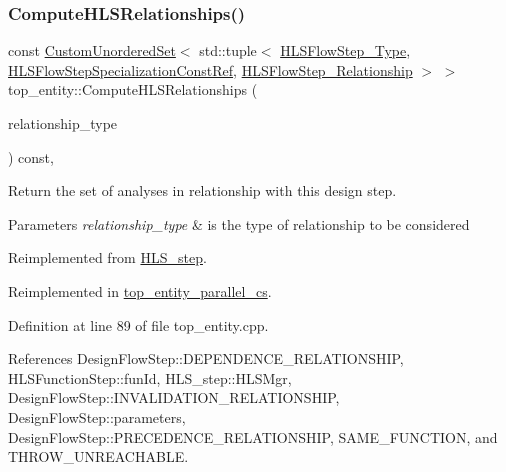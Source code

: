 \subsubsection{\texorpdfstring{Compute\+H\+L\+S\+Relationships()}{ComputeHLSRelationships()}}
{\footnotesize\ttfamily const \hyperlink{classCustomUnorderedSet}{Custom\+Unordered\+Set}$<$ std\+::tuple$<$ \hyperlink{hls__step_8hpp_ada16bc22905016180e26fc7e39537f8d}{H\+L\+S\+Flow\+Step\+\_\+\+Type}, \hyperlink{hls__step_8hpp_a5fdd2edf290c196531d21d68e13f0e74}{H\+L\+S\+Flow\+Step\+Specialization\+Const\+Ref}, \hyperlink{hls__step_8hpp_a3ad360b9b11e6bf0683d5562a0ceb169}{H\+L\+S\+Flow\+Step\+\_\+\+Relationship} $>$ $>$ top\+\_\+entity\+::\+Compute\+H\+L\+S\+Relationships (\begin{DoxyParamCaption}\item[{const \hyperlink{classDesignFlowStep_a723a3baf19ff2ceb77bc13e099d0b1b7}{Design\+Flow\+Step\+::\+Relationship\+Type}}]{relationship\+\_\+type }\end{DoxyParamCaption}) const\hspace{0.3cm}{\ttfamily [protected]}, {\ttfamily [virtual]}}



Return the set of analyses in relationship with this design step. 


\begin{DoxyParams}{Parameters}
{\em relationship\+\_\+type} & is the type of relationship to be considered \\
\hline
\end{DoxyParams}


Reimplemented from \hyperlink{classHLS__step_aed0ce8cca9a1ef18e705fc1032ad4de5}{H\+L\+S\+\_\+step}.



Reimplemented in \hyperlink{classtop__entity__parallel__cs_a619b309604994e682d4f2c4f0989efde}{top\+\_\+entity\+\_\+parallel\+\_\+cs}.



Definition at line 89 of file top\+\_\+entity.\+cpp.



References Design\+Flow\+Step\+::\+D\+E\+P\+E\+N\+D\+E\+N\+C\+E\+\_\+\+R\+E\+L\+A\+T\+I\+O\+N\+S\+H\+IP, H\+L\+S\+Function\+Step\+::fun\+Id, H\+L\+S\+\_\+step\+::\+H\+L\+S\+Mgr, Design\+Flow\+Step\+::\+I\+N\+V\+A\+L\+I\+D\+A\+T\+I\+O\+N\+\_\+\+R\+E\+L\+A\+T\+I\+O\+N\+S\+H\+IP, Design\+Flow\+Step\+::parameters, Design\+Flow\+Step\+::\+P\+R\+E\+C\+E\+D\+E\+N\+C\+E\+\_\+\+R\+E\+L\+A\+T\+I\+O\+N\+S\+H\+IP, S\+A\+M\+E\+\_\+\+F\+U\+N\+C\+T\+I\+ON, and T\+H\+R\+O\+W\+\_\+\+U\+N\+R\+E\+A\+C\+H\+A\+B\+LE.

